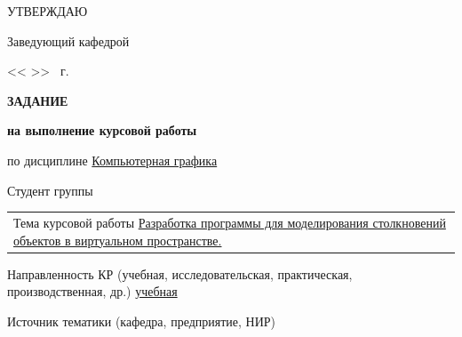 \fontsize{11pt}{11pt}\selectfont
\begin{flushright}
    \begin{minipage}{0.4\textwidth}\raggedleft

        УТВЕРЖДАЮ \hspace{2.5cm}

        Заведующий кафедрой~

        \vspace{0.3cm}

        \ulinetext{}{} 

        \vspace{0.3cm}

        << \ulinetext[1cm]{}{} >> \ulinetext{}{} \the\year \ г.
    \end{minipage}
\end{flushright}

\begin{center}\linespread{1}\selectfont
    \Large{\textbf{ЗАДАНИЕ}}

    \large{\textbf{на выполнение курсовой работы}}
\end{center}

\noindent по дисциплине \uline{\hspace{1cm} Компьютерная графика \hfill}

\noindent Студент группы 

\vspace{0.3cm}

\noindent {}

\vspace{0.3cm}

\noindent \begin{tabularx}{\linewidth}{@{}X@{}}
Тема курсовой работы \uline{
    Разработка программы для моделирования столкновений объектов в виртуальном пространстве.
    \hfill
    }
\end{tabularx}


\vspace{0.3cm}

\noindent Направленность КР (учебная, исследовательская, практическая, производственная, др.)
\noindent \uline{\hfill учебная \hfill}

\noindent Источник тематики (кафедра, предприятие, НИР)
\noindent {}

